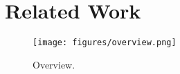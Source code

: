 \section{Related Work}




\begin{figure*}
  \centering
  \texttt{[image: figures/overview.png]}
  \caption{Overview.}
  \label{fig: system_overview}
\end{figure*}